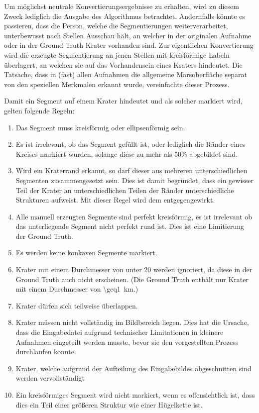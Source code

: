 Um möglichst neutrale Konvertierungsergebnisse zu erhalten, wird zu diesem Zweck lediglich die Ausgabe des Algorithmus betrachtet. Andernfalls könnte es passieren, dass die Person, welche die Segmentierungen weiterverarbeitet, unterbewusst nach Stellen Ausschau hält, an welcher in der originalen Aufnahme oder in der Ground Truth Krater vorhanden sind.
Zur eigentlichen Konvertierung wird die erzeugte Segmentierung an jenen Stellen mit kreisförmige Labeln überlagert, an welchen sie auf das Vorhandensein eines Kraters hindeutet. Die Tatsache, dass in (fast) allen Aufnahmen die allgemeine Marsoberfläche separat von den speziellen Merkmalen erkannt wurde, vereinfachte dieser Prozess.

Damit ein Segment auf einem Krater hindeutet und als solcher markiert wird, gelten folgende Regeln:

\begin{enumerate}
	\item Das Segment muss kreisförmig oder ellipsenförmig sein.
	\item Es ist irrelevant, ob das Segment gefüllt ist, oder lediglich die Ränder eines Kreises markiert wurden, solange diese zu mehr als 50\% abgebildet sind.
	\item Wird ein Kraterrand erkannt, so darf dieser aus mehreren unterschiedlichen Segmenten zusammengesetzt sein.  Dies ist damit begründet, dass ein gewisser Teil der Krater an unterschiedlichen Teilen der Ränder unterschiedliche Strukturen aufweist. Mit dieser Regel wird dem entgegengewirkt.
	\item Alle manuell erzeugten Segmente sind perfekt kreisförmig, es ist irrelevant ob das unterliegende Segment nicht perfekt rund ist. Dies ist eine Limitierung der Ground Truth.
	\item Es werden keine konkaven Segmente markiert.
	\item Krater mit einem Durchmesser von unter \SI{20}{\pixel} werden ignoriert, da diese in der Ground Truth auch nicht erscheinen. (Die Ground Truth enthält nur Krater mit einem Durchmesser von \SI{\geq1}{\kilo\meter}.)
	\item Krater dürfen sich teilweise überlappen.
	\item Krater müssen nicht vollständig im Bildbereich liegen. Dies hat die Ursache, dass die Eingabedatei aufgrund technischer Limitationen in kleinere Aufnahmen eingeteilt werden musste, bevor sie den vorgestellten Prozess durchlaufen konnte.
	\item Krater, welche aufgrund der Aufteilung des Eingabebildes abgeschnitten sind werden vervollständigt
	\item Ein kreisförmiges Segment wird nicht markiert, wenn es offensichtlich ist, dass dies ein Teil einer größeren Struktur wie einer Hügelkette ist.
\end{enumerate}

